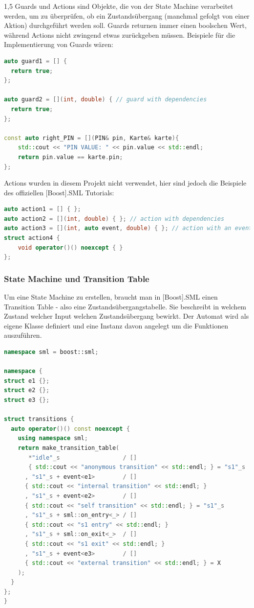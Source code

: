\documentclass[a4paper]{article}
\begin{document}
\begin{spacing}{1,5}
Guards und Actions sind Objekte, die von der State Machine verarbeitet werden, um zu überprüfen, ob ein Zustandsübergang (manchmal gefolgt von einer Aktion) durchgeführt werden soll. Guards returnen immer einen boolschen Wert, während Actions nicht zwingend etwas zurückgeben müssen.
\newline\newline
Beispiele für die Implementierung von Guards wären:

\begin{lstlisting}[language=c++]
auto guard1 = [] {
  return true;
};

auto guard2 = [](int, double) { // guard with dependencies
  return true;
};

const auto right_PIN = [](PIN& pin, Karte& karte){
    std::cout << "PIN VALUE: " << pin.value << std::endl;
    return pin.value == karte.pin;
};
\end{lstlisting}
Actions wurden in diesem Projekt nicht verwendet, hier sind jedoch die Beispiele des offiziellen [Boost].SML Tutorials:

\begin{lstlisting}[language=c++]
auto action1 = [] { };
auto action2 = [](int, double) { }; // action with dependencies
auto action3 = [](int, auto event, double) { }; // action with an event and dependencies
struct action4 {
    void operator()() noexcept { }
};
\end{lstlisting}

\newpage

\subsubsection{State Machine und Transition Table}

Um eine State Machine zu erstellen, braucht man in [Boost].SML einen Transition Table - also eine Zustandsübergangstabelle. Sie beschreibt in welchem Zustand welcher Input welchen Zustandsübergang bewirkt. Der Automat wird als eigene Klasse definiert und eine Instanz davon angelegt um die Funktionen auszuführen.

\begin{lstlisting}[language=c++]
namespace sml = boost::sml;

namespace {
struct e1 {};
struct e2 {};
struct e3 {};

struct transitions {
  auto operator()() const noexcept {
    using namespace sml;
    return make_transition_table(
       *"idle"_s                  / []
       { std::cout << "anonymous transition" << std::endl; } = "s1"_s
      , "s1"_s + event<e1>        / []
      { std::cout << "internal transition" << std::endl; }
      , "s1"_s + event<e2>        / []
      { std::cout << "self transition" << std::endl; } = "s1"_s
      , "s1"_s + sml::on_entry<_> / []
      { std::cout << "s1 entry" << std::endl; }
      , "s1"_s + sml::on_exit<_>  / []
      { std::cout << "s1 exit" << std::endl; }
      , "s1"_s + event<e3>        / []
      { std::cout << "external transition" << std::endl; } = X
    );
  }
};
}  


\end{lstlisting}
\end{spacing}
\end{document}

